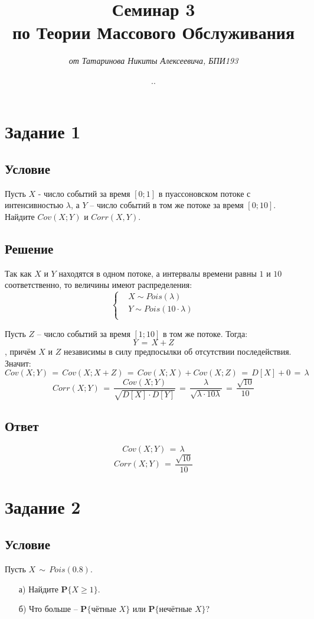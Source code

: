 \documentclass{article}
\title{\textbf{Семинар 3\\по Теории Массового Обслуживания}}
\author{\textit{от Татаринова Никиты Алексеевича, БПИ193}}
\date{\the\year .\twodigits{\the\month}.\twodigits{\the\day}}
\begin{document}
\maketitle
\section*{Задание 1}
\subsection*{Условие}
Пусть $ X $ - число событий за время $ [0;1] $ в пуассоновском потоке с интенсивностью $ \lambda $, а $ Y $ -- число событий в том же потоке за время $ [0;10] $. Найдите $ Cov(X;Y) $ и $ Corr(X,Y) $.
\subsection*{Решение}
Так как $ X $ и $ Y $ находятся в одном потоке, а интервалы времени равны $ 1 $ и $ 10 $ соответственно, то величины имеют распределения:
\begin{equation*}
\left\{
\begin{aligned}
& X \! \sim \! Pois(\lambda) \\
& Y \! \sim \! Pois(10 \! \cdot \! \lambda) \\
\end{aligned}
\right.
\end{equation*}\par
Пусть $ Z $ -- число событий за время $ [1;10] $ в том же потоке. Тогда:
\[ Y \, = \, X \! + \! Z \]
, причём $ X $ и $ Z $ независимы в силу предпосылки об отсутствии последействия. Значит:
\[ Cov(X;Y) \, = \, Cov(X;X \! + \! Z) \, = \, Cov(X;X) \! + \! Cov(X;Z) \, = \, D[X] \! + \! 0 \, = \, \lambda \]
\[ Corr(X;Y) \, = \, \dfrac{Cov(X;Y)}{\sqrt{D[X] \! \cdot \! D[Y]}} \, = \, \dfrac{\lambda}{\sqrt{\lambda \! \cdot \! 10 \lambda}} \, = \, \dfrac{\sqrt{10}}{10} \]
\subsection*{Ответ}
\[ Cov(X;Y) \, = \, \lambda \]
\[ Corr(X;Y) \, = \, \dfrac{\sqrt{10}}{10} \]
\section*{Задание 2}
\subsection*{Условие}
Пусть $ X \, \sim \, Pois(0.8) $.
\begin{enumerate}
\item[а)] Найдите $ \mathbf{P} \big\{ X \! \geqslant \! 1 \big\} $.
\item[б)] Что больше -- $ \mathbf{P} \big\{ \text{чётные } X \big\} $ или $ \mathbf{P} \big\{ \text{нечётные } X \big\} $?
\end{enumerate}
\end{document}
